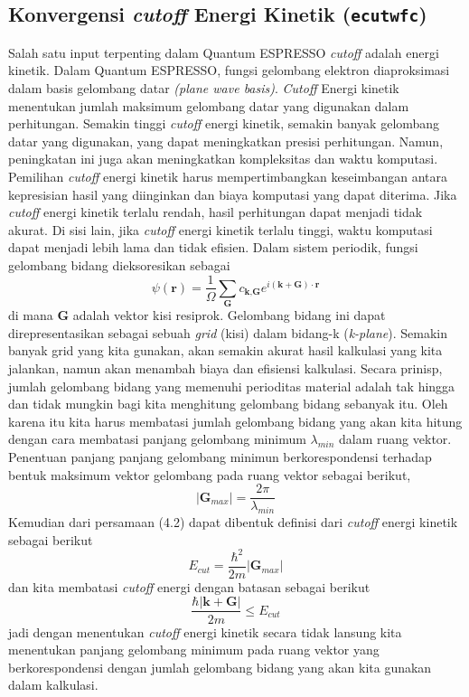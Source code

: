 \subsection{Konvergensi \textit{cutoff} Energi Kinetik (\texttt{ecutwfc})}
Salah satu input terpenting dalam Quantum ESPRESSO \textit{cutoff} adalah energi kinetik. Dalam Quantum ESPRESSO, fungsi gelombang elektron diaproksimasi dalam basis gelombang datar \textit{(plane wave basis)}\citep{DFTSholl}. \textit{Cutoff} Energi kinetik menentukan jumlah maksimum gelombang datar yang digunakan dalam perhitungan. Semakin tinggi \textit{cutoff} energi kinetik, semakin banyak gelombang datar yang digunakan, yang dapat meningkatkan presisi perhitungan. Namun, peningkatan ini juga akan meningkatkan kompleksitas dan waktu komputasi. Pemilihan \textit{cutoff} energi kinetik harus mempertimbangkan keseimbangan antara kepresisian hasil yang diinginkan dan biaya komputasi yang dapat diterima. Jika \textit{cutoff} energi kinetik terlalu rendah, hasil perhitungan dapat menjadi tidak akurat. Di sisi lain, jika \textit{cutoff} energi kinetik terlalu tinggi, waktu komputasi dapat menjadi lebih lama dan tidak efisien. Dalam sistem periodik, fungsi gelombang bidang dieksoresikan sebagai \citep{Giannozzi_2009}
\begin{equation}
    \psi (\textbf{r}) = \frac{1}{\Omega} \sum_\textbf{G} c_{\textbf{k},\textbf{G}} e^{i(\textbf{k}+\textbf{G})\cdot\textbf{r}}
\end{equation}
di mana \textbf{G} adalah vektor kisi resiprok. Gelombang bidang ini dapat direpresentasikan sebagai sebuah \textit{grid} (kisi) dalam bidang-k (\textit{k-plane}). Semakin banyak grid yang kita gunakan, akan semakin akurat hasil kalkulasi yang kita jalankan, namun akan menambah biaya dan efisiensi kalkulasi. Secara prinisp, jumlah gelombang bidang yang memenuhi perioditas material adalah tak hingga dan tidak mungkin bagi kita menghitung gelombang bidang sebanyak itu. Oleh karena itu kita harus membatasi jumlah gelombang bidang yang akan kita hitung dengan cara membatasi panjang gelombang minimum $\lambda_{min}$ dalam ruang vektor. Penentuan panjang panjang gelombang minimun berkorespondensi terhadap bentuk maksimum vektor gelombang pada ruang vektor sebagai berikut,
\begin{equation}
    |\textbf{G}_{max}|= \frac{2\pi}{\lambda_{min}}
\end{equation}
Kemudian dari persamaan (4.2) dapat dibentuk definisi dari \textit{cutoff} energi kinetik sebagai berikut
\begin{equation}
    E_{cut}=\frac{\hbar^2}{2m} |\textbf{G}_{max}|
\end{equation}
dan kita membatasi \textit{cutoff} energi dengan batasan sebagai berikut
\begin{equation}
    \frac{\hbar|\textbf{k}+\textbf{G}|}{2m}\le E_{cut}
\end{equation}
jadi dengan menentukan \textit{cutoff} energi kinetik secara tidak lansung kita menentukan panjang gelombang minimum pada ruang vektor yang berkorespondensi dengan jumlah gelombang bidang yang akan kita gunakan dalam kalkulasi.

